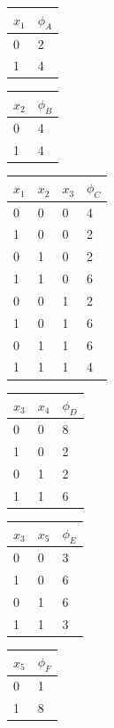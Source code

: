 \begin{center}
    \begin{tabular}{ll}
        \toprule
        $x_1$ & $\phi_A$\\
        \midrule
        0 & 2\\
        1 & 4\\
        \bottomrule
    \end{tabular}
    \hfill
    \begin{tabular}{ll}
        \toprule
        $x_2$ & $\phi_B$\\
        \midrule
        0 & 4\\
        1 & 4\\
        \bottomrule
    \end{tabular}
    \hfill
    \begin{tabular}{llll}
        \toprule
        $x_1$ & $x_2$ & $x_3$ & $\phi_C$\\
        \midrule
        0 & 0 & 0 & 4 \\
        1 & 0 & 0 & 2 \\
        0 & 1 & 0 & 2 \\
        1 & 1 & 0 & 6 \\
        0 & 0 & 1 & 2 \\
        1 & 0 & 1 & 6 \\
        0 & 1 & 1 & 6 \\
        1 & 1 & 1 & 4 \\
        \bottomrule
    \end{tabular}
    \hfill
    \begin{tabular}{lll}
        \toprule
        $x_3$ & $x_4$ & $\phi_D$\\
        \midrule
        0 & 0 &  8 \\
        1 & 0 &  2 \\
        0 & 1 &  2 \\
        1 & 1 &  6 \\
        \bottomrule
    \end{tabular}
    \hfill
    \begin{tabular}{lll}
        \toprule
        $x_3$ & $x_5$ & $\phi_E$\\
        \midrule
        0 & 0 &  3 \\
        1 & 0 &  6 \\
        0 & 1 &  6 \\
        1 & 1 &  3 \\
        \bottomrule
    \end{tabular}
    \hfill
    \begin{tabular}{ll}
        \toprule
        $x_5$ & $\phi_F$\\
        \midrule
        0 & 1\\
        1 & 8\\
        \bottomrule
    \end{tabular}
    
    
\end{center}

